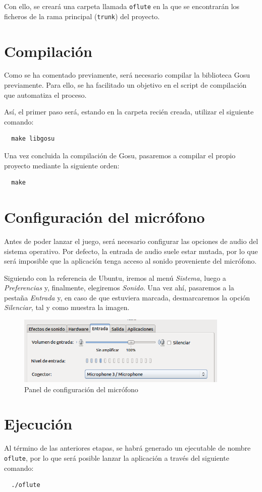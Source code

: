 Con ello, se creará una carpeta llamada \texttt{oflute} en la que se encontrarán
los ficheros de la rama principal (\texttt{trunk}) del proyecto.

\section{Compilación}

Como se ha comentado previamente, será necesario compilar la biblioteca Gosu
previamente. Para ello, se ha facilitado un objetivo en el script de compilación
 que automatiza el proceso.

Así, el primer paso será, estando en la carpeta recién creada, utilizar el
siguiente comando:

\begin{verbatim}
  make libgosu
\end{verbatim}

Una vez concluida la compilación de Gosu, pasaremos a compilar el propio
proyecto mediante la siguiente orden:

\begin{verbatim}
  make
\end{verbatim}

\section{Configuración del micrófono}
Antes de poder lanzar el juego, será necesario configurar las opciones de audio
del sistema operativo. Por defecto, la entrada de audio suele estar mutada, por
lo que será imposible que la aplicación tenga acceso al sonido proveniente del
micrófono.

Siguiendo con la referencia de Ubuntu, iremos al menú \textit{Sistema}, luego a
\textit{Preferencias} y, finalmente, elegiremos \textit{Sonido}. Una vez ahí,
pasaremos a la pestaña \textit{Entrada} y, en caso de que estuviera marcada,
desmarcaremos la opción \textit{Silenciar}, tal y como muestra la imagen.

\begin{figure}[h!]
  \centering
  \includegraphics[width=0.9\textwidth]{apendice_manual_instalacion/imagen_captura_1}
  \caption{Panel de configuración del micrófono}
\end{figure}


\section{Ejecución}

Al término de las anteriores etapas, se habrá generado un ejecutable de nombre
\texttt{oflute}, por lo que será posible lanzar la aplicación a través del
siguiente comando:

\begin{verbatim}
  ./oflute
\end{verbatim}

